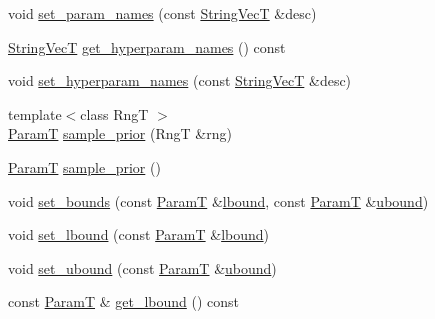 \begin{DoxyCompactItemize}
\item 
void \hyperlink{classmappel_1_1PointEmitterModel_a2abccbca47fc60700d73244e6c4dbe30}{set\+\_\+param\+\_\+names} (const \hyperlink{namespacemappel_aae88cf18bccfbb789a6019bcfbbfca68}{String\+VecT} \&desc)
\item 
\hyperlink{namespacemappel_aae88cf18bccfbb789a6019bcfbbfca68}{String\+VecT} \hyperlink{classmappel_1_1PointEmitterModel_a1b8bbd4bdddfb8f5236e8e50fe546c36}{get\+\_\+hyperparam\+\_\+names} () const 
\item 
void \hyperlink{classmappel_1_1PointEmitterModel_a6cdba258bda50cff162dc16a49383bb0}{set\+\_\+hyperparam\+\_\+names} (const \hyperlink{namespacemappel_aae88cf18bccfbb789a6019bcfbbfca68}{String\+VecT} \&desc)
\item 
{\footnotesize template$<$class RngT $>$ }\\\hyperlink{classmappel_1_1PointEmitterModel_a665ec6aea3aac139bb69a23c06d4b9a1}{ParamT} \hyperlink{classmappel_1_1PointEmitterModel_a031ef6c978371ce3774dffe811060842}{sample\+\_\+prior} (RngT \&rng)
\item 
\hyperlink{classmappel_1_1PointEmitterModel_a665ec6aea3aac139bb69a23c06d4b9a1}{ParamT} \hyperlink{classmappel_1_1PointEmitterModel_a481a8021b13918c01f7ff5b657418227}{sample\+\_\+prior} ()
\item 
void \hyperlink{classmappel_1_1PointEmitterModel_a31f139d9eb58f210f3359a9f5be9dd15}{set\+\_\+bounds} (const \hyperlink{classmappel_1_1PointEmitterModel_a665ec6aea3aac139bb69a23c06d4b9a1}{ParamT} \&\hyperlink{classmappel_1_1PointEmitterModel_a889bc82f74cfa654da121e5770296ab2}{lbound}, const \hyperlink{classmappel_1_1PointEmitterModel_a665ec6aea3aac139bb69a23c06d4b9a1}{ParamT} \&\hyperlink{classmappel_1_1PointEmitterModel_a35b883e84b6a2e0093bdf482c623beef}{ubound})
\item 
void \hyperlink{classmappel_1_1PointEmitterModel_a737fa5857415b9830fa2e5ccdff48541}{set\+\_\+lbound} (const \hyperlink{classmappel_1_1PointEmitterModel_a665ec6aea3aac139bb69a23c06d4b9a1}{ParamT} \&\hyperlink{classmappel_1_1PointEmitterModel_a889bc82f74cfa654da121e5770296ab2}{lbound})
\item 
void \hyperlink{classmappel_1_1PointEmitterModel_a7363961cc405e585b39e81a7ad85c8d6}{set\+\_\+ubound} (const \hyperlink{classmappel_1_1PointEmitterModel_a665ec6aea3aac139bb69a23c06d4b9a1}{ParamT} \&\hyperlink{classmappel_1_1PointEmitterModel_a35b883e84b6a2e0093bdf482c623beef}{ubound})
\item 
const \hyperlink{classmappel_1_1PointEmitterModel_a665ec6aea3aac139bb69a23c06d4b9a1}{ParamT} \& \hyperlink{classmappel_1_1PointEmitterModel_aeb486e8f6f6fa694e3746e84eebcf848}{get\+\_\+lbound} () const 

\end{DoxyCompactItemize}
